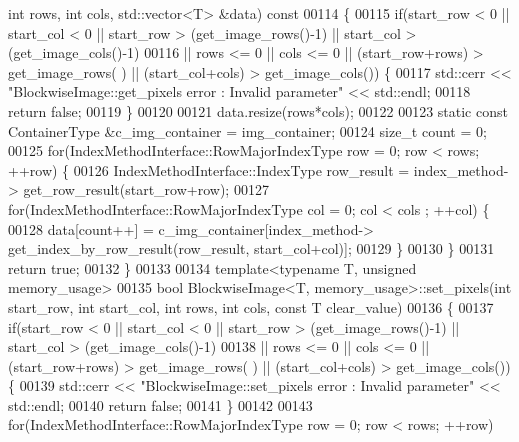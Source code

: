 \begin{DoxyCode}
{      int} rows, \textcolor{keywordtype}{int} cols, std::vector<T> &data)\textcolor{keyword}{ const}
00114 \textcolor{keyword}{}\{
00115         \textcolor{keywordflow}{if}(start\_row < 0 || start\_col < 0 || start\_row > (get\_image\_rows()-1) 
      || start\_col > (get\_image\_cols()-1)
00116                 || rows <= 0 || cols <= 0 || (start\_row+rows) > get\_image\_rows(
      ) || (start\_col+cols) > get\_image\_cols()) \{
00117                         std::cerr << \textcolor{stringliteral}{"BlockwiseImage::get\_pixels error :
       Invalid parameter"} << std::endl;
00118                         \textcolor{keywordflow}{return} \textcolor{keyword}{false};
00119         \}
00120 
00121         data.resize(rows*cols);
00122 
00123         \textcolor{keyword}{static} \textcolor{keyword}{const} ContainerType &c\_img\_container = img\_container;
00124         \textcolor{keywordtype}{size\_t} count = 0;
00125         \textcolor{keywordflow}{for}(IndexMethodInterface::RowMajorIndexType row = 0; row < rows; ++row)
       \{
00126                 IndexMethodInterface::IndexType row\_result = index\_method->
      get\_row\_result(start\_row+row);
00127                 \textcolor{keywordflow}{for}(IndexMethodInterface::RowMajorIndexType col = 0; col < cols
      ; ++col) \{
00128                         data[count++] = c\_img\_container[index\_method->
      get\_index\_by\_row\_result(row\_result, start\_col+col)];
00129                 \}
00130         \}
00131         \textcolor{keywordflow}{return} \textcolor{keyword}{true};
00132 \}
00133 
00134 \textcolor{keyword}{template}<\textcolor{keyword}{typename} T, \textcolor{keywordtype}{unsigned} memory\_usage>
00135 \textcolor{keywordtype}{bool} BlockwiseImage<T, memory_usage>::set_pixels(\textcolor{keywordtype}{int} start\_row, \textcolor{keywordtype}{int} start\_col, \textcolor{keywordtype}{
      int} rows, \textcolor{keywordtype}{int} cols, \textcolor{keyword}{const} T clear\_value)
00136 \{
00137         \textcolor{keywordflow}{if}(start\_row < 0 || start\_col < 0 || start\_row > (get\_image\_rows()-1) 
      || start\_col > (get\_image\_cols()-1)
00138                 || rows <= 0 || cols <= 0 || (start\_row+rows) > get\_image\_rows(
      ) || (start\_col+cols) > get\_image\_cols()) \{
00139                         std::cerr << \textcolor{stringliteral}{"BlockwiseImage::set\_pixels error :
       Invalid parameter"} << std::endl;
00140                         \textcolor{keywordflow}{return} \textcolor{keyword}{false};
00141         \}
00142 
00143         \textcolor{keywordflow}{for}(IndexMethodInterface::RowMajorIndexType row = 0; row < rows; ++row)

\end{DoxyCode}
